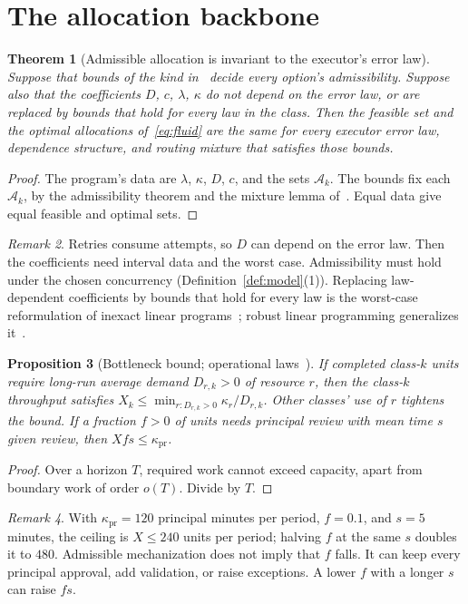 \documentclass[11pt]{article}
\newtheorem{theorem}{Theorem}
\newtheorem{proposition}[theorem]{Proposition}
\theoremstyle{definition}
\theoremstyle{remark}
\newtheorem{remark}[theorem]{Remark}
\newcommand{\pr}{\mathrm{pr}}
\begin{document}
\section{The allocation backbone}\label{sec:backbone}
\begin{theorem}[Admissible allocation is invariant to the executor's error law]\label{thm:invariance}
Suppose that bounds of the kind in~\cite{p6} decide every option's admissibility. Suppose also that
the coefficients $D$, $c$, $\lambda$, $\kappa$ do not depend on the error law, or are replaced by
bounds that hold for every law in the class. Then the feasible set and the optimal allocations
of~\eqref{eq:fluid} are the same for every executor error law, dependence structure, and routing
mixture that satisfies those bounds.
\end{theorem}
\begin{proof}
The program's data are $\lambda$, $\kappa$, $D$, $c$, and the sets $\mathcal A_k$. The bounds fix
each $\mathcal A_k$, by the admissibility theorem and the mixture lemma of~\cite{p6}. Equal data give
equal feasible and optimal sets.
\end{proof}
\begin{remark}
Retries consume attempts, so $D$ can depend on the error law. Then the coefficients need interval
data and the worst case. Admissibility must hold under the chosen concurrency
(Definition~\ref{def:model}(1)). Replacing law-dependent coefficients by bounds that hold for every
law is the worst-case reformulation of inexact linear programs~\cite{soyster73}; robust linear
programming generalizes it~\cite{bental99}.
\end{remark}

\begin{proposition}[Bottleneck bound; operational laws~\cite{buzen76,denning}]\label{prop:bottleneck}
If completed class-$k$ units require long-run average demand $D_{r,k}>0$ of resource $r$, then the
class-$k$ throughput satisfies $X_k\le\min_{r:D_{r,k}>0}\kappa_r/D_{r,k}$. Other classes' use of $r$
tightens the bound. If a fraction $f>0$ of units needs principal review with mean time $s$ given
review, then $Xfs\le\kappa_{\pr}$.
\end{proposition}
\begin{proof}
Over a horizon $T$, required work cannot exceed capacity, apart from boundary work of order $o(T)$.
Divide by $T$.
\end{proof}
\begin{remark}\label{rem:bottleneck}
With $\kappa_{\pr}=120$ principal minutes per period, $f=0.1$, and $s=5$ minutes, the ceiling is
$X\le240$ units per period; halving $f$ at the same $s$ doubles it to $480$. Admissible mechanization
does not imply that $f$ falls. It can keep every principal approval, add validation, or raise
exceptions. A lower $f$ with a longer $s$ can raise $fs$.
\end{remark}
\end{document}
